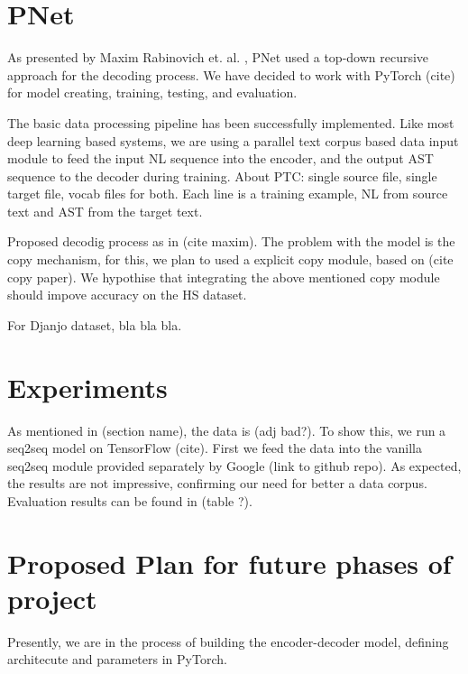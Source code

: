 \documentclass{IEEEtran}
\begin{document}
    \section{PNet}

    As presented by Maxim Rabinovich et. al. \cite{rabinovich2017abstract}, PNet used a top-down
    recursive approach for the decoding process. We have decided to work with PyTorch (cite)
    for model creating, training, testing, and evaluation.

    The basic data processing pipeline has been successfully implemented. Like most deep learning
    based systems, we are using a parallel text corpus based data input module to feed 
    the input NL sequence into the encoder, and the output AST sequence to the decoder during
    training. About PTC: single source file, single target file, vocab files for both. 
    Each line is a training example, NL from source text and AST from the target text. 

    Proposed decodig process as in (cite maxim). The problem with the model is the copy
    mechanism, for this, we plan to used a explicit copy module, based on (cite copy paper).
    We hypothise that integrating the above mentioned copy module should impove accuracy on the
    HS dataset.

    For Djanjo dataset, bla bla bla.

    \section{Experiments}

    As mentioned in (section name), the data is (adj bad?). To show this, we run a seq2seq 
    model on TensorFlow (cite). First we feed the data into the vanilla seq2seq module 
    provided separately by Google (link to github repo). As expected, the results are not
    impressive, confirming our need for better a data corpus. Evaluation results can be found
    in (table ?).

    \section{Proposed Plan for future phases of project}

    Presently, we are in the process of building the encoder-decoder model, defining 
    architecute and parameters in PyTorch. 

    
    
\end{document}
